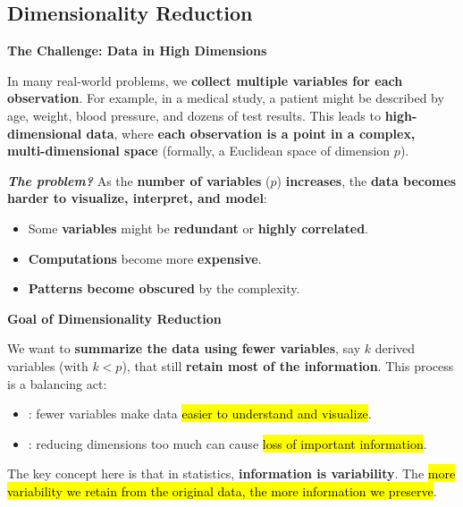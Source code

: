 \subsection{Dimensionality Reduction}\label{subsection: Dimensionality Reduction}

\begin{flushleft}
    \textcolor{Red2}{ \textbf{The Challenge: Data in High Dimensions}}
\end{flushleft}
In many real-world problems, we \textbf{collect multiple variables for each observation}. For example, in a medical study, a patient might be described by age, weight, blood pressure, and dozens of test results. This leads to \textbf{high-dimensional data}, where \textbf{each observation is a point in a complex, multi-dimensional space} (formally, a Euclidean space of dimension $p$).

\highspace
\textcolor{Red2}{\textbf{\emph{The problem?}}} As the \textbf{number of variables} ($p$) \textbf{increases}, the \textbf{data becomes harder to visualize, interpret, and model}:
\begin{itemize}[label=\textcolor{Red2}{}]
    \item Some \textbf{variables} might be \textbf{redundant} or \textbf{highly correlated}.
    \item \textbf{Computations} become more \textbf{expensive}.
    \item \textbf{Patterns become obscured} by the complexity.
\end{itemize}

\highspace
\begin{flushleft}
    \textcolor{Green3}{ \textbf{Goal of Dimensionality Reduction}}
\end{flushleft}
We want to \textbf{summarize the data using fewer variables}, say $k$ derived variables (with $k < p$), that still \textbf{retain most of the information}. This process is a balancing act:
\begin{itemize}
    \item {}: fewer variables make data \hl{easier to understand and visualize}.
    \item {}: reducing dimensions too much can cause \hl{loss of important information}.
\end{itemize}
The key concept here is that in statistics, \textbf{information is variability}. The \hl{more variability we retain from the original data, the more information we preserve}.

